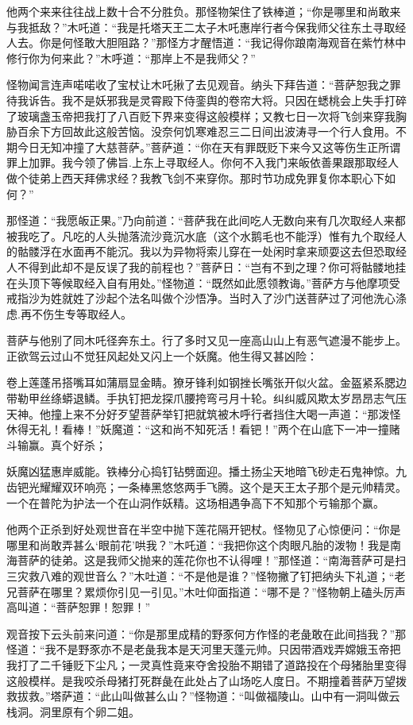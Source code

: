 \documentclass[12pt,UTF8]{ctexbook}
\begin{document}
{他两个来来往往战上数十合不分胜负。那怪物架住了铁棒道；“你是哪里和尚敢来与我抵敌？”木吒道：“我是托塔天王二太子木吒惠岸行者今保我师父往东土寻取经人去。你是何怪敢大胆阻路？”那怪方才醒悟道：“我记得你踉南海观音在紫竹林中修行你为何来此？”木呼道：“那岸上不是我师父？”

怪物闻言连声喏喏收了宝杖让木吒揪了去见观音。纳头下拜告道：“菩萨恕我之罪待我诉告。我不是妖邪我是灵霄殿下侍銮舆的卷帘大将。只因在蟋桃会上失手打碎了玻璃盏玉帝把我打了八百贬下界来变得这般模样；又教七日一次将飞剑来穿我胸胁百余下方回故此这般苦恼。没奈何饥寒难忍三二日间出波涛寻一个行人食用。不期今日无知冲撞了大慈菩萨。”菩萨道：“你在天有罪既贬下来今又这等伤生正所谓罪上加罪。我今领了佛旨.上东上寻取经人。你何不入我门来皈依善果跟那取经人做个徒弟上西天拜佛求经？我教飞剑不来穿你。那时节功成免罪复你本职心下如何？”

那怪道：“我愿皈正果。”乃向前道：“菩萨我在此间吃人无数向来有几次取经人来都被我吃了。凡吃的人头抛落流沙竟沉水底（这个水鹅毛也不能浮）惟有九个取经人的骷髅浮在水面再不能沉。我以为异物将索儿穿在一处闲时拿来顽耍这去但恐取经人不得到此却不是反误了我的前程也？”菩萨日：“岂有不到之理？你可将骷髅地挂在头顶下等候取经入自有用处。”怪物道：“既然如此愿领教诲。”菩萨方与他摩项受戒指沙为姓就姓了沙起个法名叫做个沙悟净。当时入了沙门送菩萨过了河他洗心涤虑.再不伤生专等取经人。

菩萨与他别了同木吒径奔东土。行了多时又见一座高山山上有恶气遮漫不能步上。正欲驾云过山不觉狂风起处又闪上一个妖魔。他生得又甚凶险：

卷上莲蓬吊搭嘴耳如蒲扇显金睛。獠牙锋利如钢挫长嘴张开似火盆。金盔紧系腮边带勒甲丝绦蟒退鳞。手执钉把龙探爪腰挎弯弓月十轮。纠纠威风欺太岁昂昂志气压天神。他撞上来不分好歹望菩萨举钉把就筑被木呼行者挡住大喝一声道：“那泼怪休得无礼！看棒！”妖魔道：“这和尚不知死活！看钯！”两个在山底下一冲一撞赌斗输赢。真个好杀；

妖魔凶猛惠岸威能。铁棒分心捣钉钻劈面迎。播土扬尘天地暗飞砂走石鬼神惊。九齿钯光耀耀双环响亮；一条棒黑悠悠两手飞腾。这个是天王太子那个是元帅精灵。一个在普陀为护法一个在山洞作妖精。这场相遇争高下不知那个亏输那个赢。

他两个正杀到好处观世音在半空中抛下莲花隔开钯杖。怪物见了心惊便问：“你是哪里和尚敢弄甚么‘眼前花’哄我？”木吒道：“我把你这个肉眼凡胎的泼物！我是南海菩萨的徒弟。这是我师父抛来的莲花你也不认得哩！”那怪道：“南海菩萨可是扫三灾救八难的观世音么？”木吐道：“不是他是谁？”怪物撇了钉把纳头下礼道；“老兄菩萨在哪里？累烦你引见一引见。”木吐仰面指道：“哪不是？”怪物朝上磕头厉声高叫道：“菩萨恕罪！恕罪！”

观音按下云头前来问道：“你是那里成精的野豕何方作怪的老彘敢在此间挡我？”那怪道：“我不是野豕亦不是老彘我本是天河里天蓬元帅。只因带酒戏弄嫦娥玉帝把我打了二千锤贬下尘凡；一灵真性竟来夺舍投胎不期错了道路投在个母猪胎里变得这般模样。是我咬杀母猪打死群彘在此处占了山场吃人度日。不期撞着菩萨万望拨救拔救。”塔萨道：“此山叫做甚么山？”怪物道：“叫做福陵山。山中有一洞叫做云栈洞。洞里原有个卵二姐。

}
\end{document}
